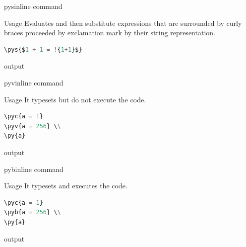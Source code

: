 \documentclass[
aspectratio=1610,
hyperref={pdfpagemode=FullScreen},
english,
usenames,
dvipsnames
]
{beamer} %
\begin{document}
\begin{frame}[fragile]{pys}{inline command}
  
  \begin{block}{Usage}
  Evaluates and then substitute expressions that are surrounded by curly braces proceeded by exclamation mark by their string representation. 
  \end{block}
  
  \begin{lstlisting}[language=python]
\pys{$1 + 1 = !{1+1}$}
  \end{lstlisting}
  
  	\begin{exampleblock}{output}
    \onslide
	\end{exampleblock}
  
  \end{frame}
  
  \begin{frame}[fragile]{pyv}{inline command}
  
  \begin{block}{Usage}
  	It typesets but do not execute the code. 
  \end{block}
  
  \begin{lstlisting}[language=python]
\pyc{a = 1}
\pyv{a = 256} \\
\py{a}
  \end{lstlisting}
  
  	\begin{exampleblock}{output}
 \\
    \onslide
	\end{exampleblock}
  
  \end{frame}
  
  
   \begin{frame}[fragile]{pyb}{inline command}
  
  \begin{block}{Usage}
  	It typesets and executes the code. 
  \end{block}
  
  \begin{lstlisting}[language=python]
\pyc{a = 1}
\pyb{a = 256} \\
\py{a}
  \end{lstlisting}
  
  	\begin{exampleblock}{output}
 \\
    \onslide
	\end{exampleblock}
  
  \end{frame}
  
\end{document}
